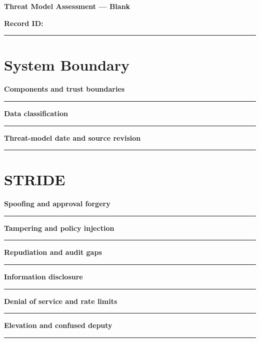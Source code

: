 \documentclass[11pt,letterpaper]{article}
\begin{document}
\begin{center}{\LARGE\bfseries Threat Model Assessment --- Blank}\par
\vspace{4pt}{\small Print-ready unfilled assessment instrument}\par
\end{center}
\noindent\textbf{Record ID:} \rule{2.6in}{0.4pt}\par
\section{System Boundary}
\noindent\textbf{Components and trust boundaries}\par
\vspace{1.1em}\noindent\rule{0.96\linewidth}{0.4pt}\par\vspace{0.65em}
\noindent\textbf{Data classification}\par
\vspace{1.1em}\noindent\rule{0.96\linewidth}{0.4pt}\par\vspace{0.65em}
\noindent\textbf{Threat-model date and source revision}\par
\vspace{1.1em}\noindent\rule{0.96\linewidth}{0.4pt}\par\vspace{0.65em}
\section{STRIDE}
\noindent\textbf{Spoofing and approval forgery}\par
\vspace{1.1em}\noindent\rule{0.96\linewidth}{0.4pt}\par\vspace{0.65em}
\noindent\textbf{Tampering and policy injection}\par
\vspace{1.1em}\noindent\rule{0.96\linewidth}{0.4pt}\par\vspace{0.65em}
\noindent\textbf{Repudiation and audit gaps}\par
\vspace{1.1em}\noindent\rule{0.96\linewidth}{0.4pt}\par\vspace{0.65em}
\noindent\textbf{Information disclosure}\par
\vspace{1.1em}\noindent\rule{0.96\linewidth}{0.4pt}\par\vspace{0.65em}
\noindent\textbf{Denial of service and rate limits}\par
\vspace{1.1em}\noindent\rule{0.96\linewidth}{0.4pt}\par\vspace{0.65em}
\noindent\textbf{Elevation and confused deputy}\par
\vspace{1.1em}\noindent\rule{0.96\linewidth}{0.4pt}\par\vspace{0.65em}
\end{document}
